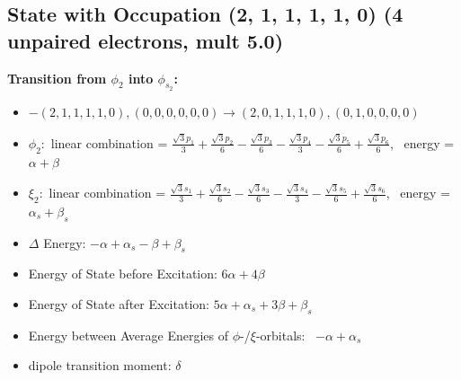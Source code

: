 \documentclass[12pt,a4paper]{article}
\begin{document}
\subsection*{State with Occupation (2, 1, 1, 1, 1, 0) (4 unpaired electrons, mult 5.0)}
        \noindent\textbf{Transition from $\phi_{2}$ into $\phi_{s_{2}}$:}
        \begin{itemize}
            \item $- (2, 1, 1, 1, 1, 0), (0, 0, 0, 0, 0, 0) \rightarrow (2, 0, 1, 1, 1, 0), (0, 1, 0, 0, 0, 0)$
        
            \item $\phi_{2}:$ linear combination = $\frac{\sqrt{3} p_{1}}{3} + \frac{\sqrt{3} p_{2}}{6} - \frac{\sqrt{3} p_{3}}{6} - \frac{\sqrt{3} p_{4}}{3} - \frac{\sqrt{3} p_{5}}{6} + \frac{\sqrt{3} p_{6}}{6}$, \
            energy = $\alpha + \beta$
            
            \item $\xi_{2}:$ linear combination = $\frac{\sqrt{3} s_{1}}{3} + \frac{\sqrt{3} s_{2}}{6} - \frac{\sqrt{3} s_{3}}{6} - \frac{\sqrt{3} s_{4}}{3} - \frac{\sqrt{3} s_{5}}{6} + \frac{\sqrt{3} s_{6}}{6}$, \
            energy = $\alpha_{s} + \beta_{s}$
            
            \item $\Delta$ Energy: $- \alpha + \alpha_{s} - \beta + \beta_{s}$
            \item Energy of State before Excitation: $6 \alpha + 4 \beta$
            \item Energy of State after Excitation: $5 \alpha + \alpha_{s} + 3 \beta + \beta_{s}$
            \item Energy between Average Energies of $\phi$-/$\xi$-orbitals: \
            $- \alpha + \alpha_{s}$
        
            \item dipole transition moment: $\delta$
        
        \end{itemize}
        
\end{document}
